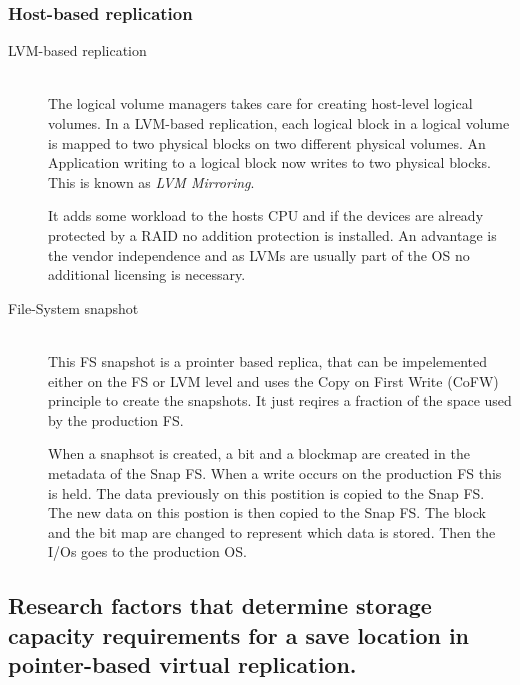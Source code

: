	\subsubsection{Host-based replication} %
	\label{ssub:host_based_replication}
		\begin{description}
			\item[LVM-based replication] \hfill \\
				The logical volume managers takes care for creating host-level logical volumes.
				In a LVM-based replication,
				each logical block in a logical volume is mapped to two physical blocks
				on two different physical volumes.
				An Application writing to a logical block now writes to two physical blocks.
				This is known as \emph{LVM Mirroring}.

				It adds some workload to the hosts CPU
				and if the devices are already protected by a RAID
				no addition protection is installed.
				An advantage is the vendor independence
				and as LVMs are usually part of the OS no additional licensing is necessary.
			\item[File-System snapshot] \hfill \\
				This FS snapshot is a prointer based replica,
				that can be impelemented either on the FS or LVM level
				and uses the Copy on First Write (CoFW) principle to create the snapshots.
				It just reqires a fraction of the space used by the production FS.

				When a snaphsot is created,
				a bit and a blockmap are created in the metadata of the Snap FS.
				When a write occurs on the production FS this is held.
				The data previously on this postition is copied to the Snap FS.
				The new data on this postion is then copied to the Snap FS.
				The block and the bit map are changed to represent which data is stored.
				Then the I/Os goes to the production OS.
		\end{description}

\subsection{Research factors that determine storage capacity requirements for a save location in pointer-based virtual replication.} %
\label{sub:research_factors_that_determine_storage_capacity_requirements_for_a_save_location_in_pointer_based_virtual_replication}

